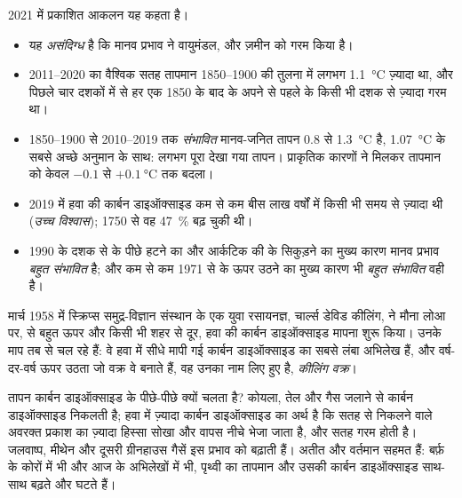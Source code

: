 2021 में प्रकाशित आकलन यह कहता है।
\begin{itemize}
  \item यह \emph{असंदिग्ध} है कि मानव प्रभाव ने वायुमंडल,  और ज़मीन को गरम
        किया है।
  \item 2011--2020 का वैश्विक सतह तापमान 1850--1900 की तुलना में लगभग
        \qty{1.1}{\degreeCelsius} ज़्यादा था, और पिछले चार दशकों में से हर एक 1850 के
        बाद के अपने से पहले के किसी भी दशक से ज़्यादा गरम
        था।
  \item 1850--1900 से 2010--2019 तक \emph{संभावित} मानव-जनित तापन 0.8 से
        \qty{1.3}{\degreeCelsius} है, \qty{1.07}{\degreeCelsius} के सबसे अच्छे अनुमान
        के साथ: लगभग पूरा देखा गया तापन। प्राकृतिक कारणों ने मिलकर तापमान को केवल
        $-0.1$ से $+\qty{0.1}{\degreeCelsius}$ तक
        बदला।
  \item 2019 में हवा की कार्बन डाइऑक्साइड कम से कम बीस लाख वर्षों में किसी भी समय से
        ज़्यादा थी (\emph{उच्च विश्वास}); 1750 से वह 47~\% बढ़ चुकी
        थी।
  \item 1990 के दशक से  के पीछे हटने का और आर्कटिक की  के सिकुड़ने
        का मुख्य कारण मानव प्रभाव \emph{बहुत संभावित} है; और कम से कम 1971 से 
        के ऊपर उठने का मुख्य कारण भी \emph{बहुत संभावित}
        वही है।
\end{itemize}

\begin{history}[चार्ल्स डेविड कीलिंग का वक्र]
मार्च 1958 में स्क्रिप्स समुद्र-विज्ञान संस्थान के एक युवा रसायनज्ञ, चार्ल्स डेविड
कीलिंग, ने मौना लोआ पर,  से बहुत ऊपर और किसी भी शहर से दूर, हवा की कार्बन
डाइऑक्साइड मापना शुरू किया। उनके माप तब से चल रहे हैं: वे हवा में सीधे मापी गई कार्बन
डाइऑक्साइड का सबसे लंबा अभिलेख हैं, और वर्ष-दर-वर्ष ऊपर उठता जो वक्र वे बनाते हैं, वह
उनका नाम लिए हुए है, \emph{कीलिंग
वक्र}।
\end{history}

तापन कार्बन डाइऑक्साइड के पीछे-पीछे क्यों चलता है? कोयला, तेल और गैस जलाने से कार्बन
डाइऑक्साइड निकलती है; हवा में ज़्यादा कार्बन डाइऑक्साइड का अर्थ है कि सतह से निकलने वाले
अवरक्त प्रकाश का ज़्यादा हिस्सा सोखा और वापस नीचे भेजा जाता है, और सतह गरम होती है।
जलवाष्प, मीथेन और दूसरी ग्रीनहाउस गैसें इस प्रभाव को बढ़ाती हैं। अतीत और वर्तमान सहमत
हैं: बर्फ़ के कोरों में भी और आज के अभिलेखों में भी, पृथ्वी का तापमान और उसकी कार्बन
डाइऑक्साइड साथ-साथ बढ़ते और घटते
हैं।

